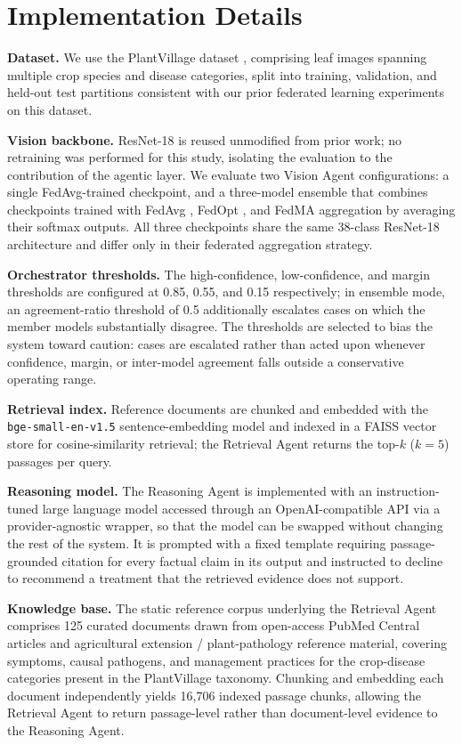 \documentclass[conference]{IEEEtran}
\begin{document}
\section{Implementation Details}
\label{sec:impl}

\textbf{Dataset.} We use the PlantVillage dataset \cite{r_hughes2015}, comprising leaf images spanning multiple crop species and disease categories, split into training, validation, and held-out test partitions consistent with our prior federated learning experiments on this dataset.

\textbf{Vision backbone.} ResNet-18 \cite{r_he2016} is reused unmodified from prior work; no retraining was performed for this study, isolating the evaluation to the contribution of the agentic layer. We evaluate two Vision Agent configurations: a single FedAvg-trained checkpoint, and a three-model ensemble that combines checkpoints trained with FedAvg \cite{r_fedavg}, FedOpt \cite{r_fedopt}, and FedMA \cite{r_fedma} aggregation by averaging their softmax outputs. All three checkpoints share the same 38-class ResNet-18 architecture and differ only in their federated aggregation strategy.

\textbf{Orchestrator thresholds.} The high-confidence, low-confidence, and margin thresholds are configured at 0.85, 0.55, and 0.15 respectively; in ensemble mode, an agreement-ratio threshold of 0.5 additionally escalates cases on which the member models substantially disagree. The thresholds are selected to bias the system toward caution: cases are escalated rather than acted upon whenever confidence, margin, or inter-model agreement falls outside a conservative operating range.

\textbf{Retrieval index.} Reference documents are chunked and embedded with the \texttt{bge-small-en-v1.5} sentence-embedding model and indexed in a FAISS vector store \cite{r_faiss} for cosine-similarity retrieval; the Retrieval Agent returns the top-$k$ ($k=5$) passages per query.

\textbf{Reasoning model.} The Reasoning Agent is implemented with an instruction-tuned large language model accessed through an OpenAI-compatible API via a provider-agnostic wrapper, so that the model can be swapped without changing the rest of the system. It is prompted with a fixed template requiring passage-grounded citation for every factual claim in its output and instructed to decline to recommend a treatment that the retrieved evidence does not support.

\textbf{Knowledge base.} The static reference corpus underlying the Retrieval Agent comprises 125 curated documents drawn from open-access PubMed Central articles and agricultural extension / plant-pathology reference material, covering symptoms, causal pathogens, and management practices for the crop-disease categories present in the PlantVillage taxonomy. Chunking and embedding each document independently yields 16{,}706 indexed passage chunks, allowing the Retrieval Agent to return passage-level rather than document-level evidence to the Reasoning Agent.
\end{document}
